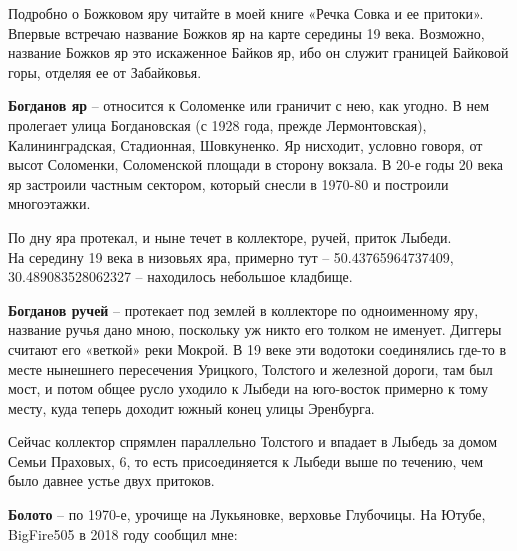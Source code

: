 Подробно о Божковом яру читайте в моей книге «Речка Совка и ее притоки». Впервые встречаю название Божков яр на карте середины 19 века. Возможно, название Божков яр это искаженное Байков яр, ибо он служит границей Байковой горы, отделяя ее от Забайковья.\\

\medskip

\textbf{Богданов яр} – относится к Соломенке или граничит с нею, как угодно. В нем пролегает улица Богдановская (с 1928 года, прежде Лермонтовская), Калининградская, Стадионная, Шовкуненко. Яр нисходит, условно говоря, от высот Соломенки, Соломенской площади в сторону вокзала. В 20-е годы 20 века яр застроили частным сектором, который снесли в 1970-80 и построили многоэтажки.

По дну яра протекал, и ныне течет в коллекторе, ручей, приток Лыбеди.\\ 

На середину 19 века в низовьях яра, примерно тут – 50.43765964737409, 30.489083528062327 – находилось небольшое кладбище.
\medskip

\textbf{Богданов ручей} – протекает под землей в коллекторе по одноименному яру, название ручья дано мною, поскольку уж никто его толком не именует. Диггеры считают его «веткой» реки Мокрой. В 19 веке эти водотоки соединялись где-то в месте нынешнего пересечения Урицкого, Толстого и железной дороги, там был мост, и потом общее русло уходило к Лыбеди на юго-восток примерно к тому месту, куда теперь доходит южный конец улицы Эренбурга.

Сейчас коллектор спрямлен параллельно Толстого и впадает в Лыбедь за домом Семьи Праховых, 6, то есть присоединяется к Лыбеди выше по течению, чем было давнее устье двух притоков.\\

\medskip

\textbf{Болото} – по 1970-е, урочище на Лукьяновке, верховье Глубочицы. На Ютубе, BigFire505 в 2018 году сообщил мне:

